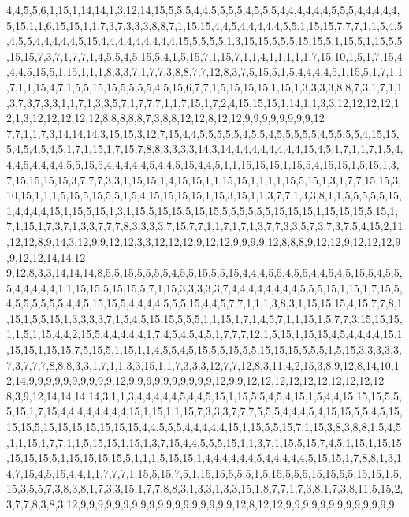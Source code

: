 4,4,5,5,6,1,15,1,14,14,1,3,12,14,15,5,5,5,4,4,5,5,5,5,4,5,5,5,4,4,4,4,4,4,5,5,5,4,4,4,4,4,5,15,1,1,6,15,15,1,1,7,3,7,3,3,3,8,8,7,1,15,15,4,4,5,4,4,4,4,4,5,5,1,15,15,7,7,7,1,1,5,4,5,4,5,5,4,4,4,4,4,5,15,4,4,4,4,4,4,4,4,4,15,5,5,5,5,1,3,15,15,5,5,5,15,15,5,1,15,5,1,15,5,5,15,15,7,3,7,1,7,7,1,4,5,5,4,5,15,5,4,1,5,15,7,1,15,7,1,1,4,1,1,1,1,1,7,15,10,1,5,1,7,15,4,4,4,5,15,5,1,15,1,1,1,8,3,3,7,1,7,7,3,8,8,7,7,12,8,3,7,5,15,5,1,5,4,4,4,4,5,1,15,5,1,7,1,1,7,1,1,15,4,7,1,5,5,15,15,5,5,5,5,4,5,15,6,7,7,1,5,15,15,15,1,15,1,3,3,3,3,8,8,7,3,1,7,1,1,3,7,3,7,3,3,1,1,7,1,3,3,5,7,1,7,7,7,1,1,7,15,1,7,2,4,15,15,15,1,14,1,1,3,3,12,12,12,12,12,1,3,12,12,12,12,12,8,8,8,8,8,7,3,8,8,12,12,8,12,12,9,9,9,9,9,9,9,9,12
7,7,1,1,7,3,14,14,14,3,15,15,3,12,7,15,4,4,5,5,5,5,5,4,5,5,4,5,5,5,5,5,4,5,5,5,5,4,15,15,5,4,5,4,5,4,5,1,7,1,15,1,7,15,7,8,8,3,3,3,3,14,3,14,4,4,4,4,4,4,4,4,15,4,5,1,7,1,1,7,1,5,4,4,4,5,4,4,4,4,5,5,15,5,4,4,4,4,4,5,4,4,5,15,4,4,5,1,1,15,15,15,1,15,5,4,15,15,1,5,15,1,3,7,15,15,15,15,3,7,7,7,3,3,1,15,15,1,4,15,15,1,1,15,15,1,1,1,1,15,5,15,1,3,1,7,7,15,15,3,10,15,1,1,1,5,15,5,15,5,5,1,5,4,15,15,15,15,1,15,3,15,1,1,3,7,7,1,3,3,8,1,1,5,5,5,5,5,15,1,4,4,4,4,15,1,15,5,15,1,3,1,15,5,15,15,5,15,15,5,5,5,5,5,5,15,15,15,1,15,15,15,5,15,1,7,1,15,1,7,3,7,1,3,3,7,7,7,8,3,3,3,3,7,15,7,7,1,1,7,1,7,1,3,7,7,3,3,5,7,3,7,3,7,5,4,15,2,11,12,12,8,9,14,3,12,9,9,12,12,3,3,12,12,12,9,12,12,9,9,9,9,12,8,8,8,9,12,12,9,12,12,12,9,9,12,12,14,14,12
9,12,8,3,3,14,14,14,8,5,5,15,5,5,5,5,4,5,5,15,5,5,15,4,4,4,5,5,4,5,5,4,4,5,4,5,15,5,4,5,5,5,4,4,4,4,4,1,1,15,15,5,15,15,5,7,1,15,3,3,3,3,3,7,4,4,4,4,4,4,4,4,5,5,5,15,1,15,1,7,15,5,4,5,5,5,5,5,5,4,4,5,15,15,5,4,4,4,4,5,5,5,15,4,4,5,7,7,1,1,1,3,8,3,1,15,15,15,4,15,7,7,8,1,15,1,5,5,15,1,3,3,3,3,7,1,5,4,5,15,15,5,5,5,1,1,15,1,7,1,4,5,7,1,1,15,1,5,7,7,3,15,15,15,1,1,5,1,15,4,4,2,15,5,4,4,4,4,4,1,7,4,5,4,5,4,5,1,7,7,7,12,1,5,15,1,15,15,4,5,4,4,4,4,15,1,15,15,1,15,15,7,5,15,5,1,15,1,1,4,5,5,4,5,15,5,5,15,5,5,15,15,15,5,5,5,1,5,15,3,3,3,3,3,7,3,7,7,7,8,8,8,3,3,1,7,1,1,3,3,15,1,1,7,3,3,3,12,7,7,12,8,3,11,4,2,15,3,8,9,12,8,14,10,12,14,9,9,9,9,9,9,9,9,9,9,12,9,9,9,9,9,9,9,9,9,9,12,9,9,12,12,12,12,12,12,12,12,12,12
8,3,9,12,14,14,14,14,3,1,1,3,4,4,4,4,4,5,4,4,5,15,1,15,5,5,4,5,4,15,1,5,4,4,15,15,15,5,5,5,15,1,7,15,4,4,4,4,4,4,4,4,15,1,15,1,1,15,7,3,3,3,7,7,7,5,5,5,4,4,4,5,4,15,15,5,5,4,5,15,15,15,5,15,15,15,15,15,15,15,4,4,5,5,5,4,4,4,4,4,15,1,15,5,5,15,7,1,15,3,8,3,8,8,1,5,4,5,1,1,15,1,7,7,1,1,5,15,15,1,15,1,3,7,15,4,4,5,5,5,15,1,1,3,7,1,15,5,15,7,4,5,1,15,1,15,15,15,15,15,5,1,15,15,15,15,5,1,1,1,5,15,15,1,4,4,4,4,4,4,5,4,4,4,4,4,5,15,15,1,7,8,8,1,3,14,7,15,4,5,15,4,4,1,1,7,7,7,1,15,5,15,7,5,1,15,15,5,5,5,1,5,15,5,5,5,15,15,5,5,15,15,1,5,15,3,5,5,7,3,8,3,8,1,7,3,3,15,1,7,7,8,8,3,1,3,3,1,3,3,15,1,8,7,7,1,7,3,8,1,7,3,8,11,5,15,2,3,7,7,8,3,8,3,12,9,9,9,9,9,9,9,9,9,9,9,9,9,9,9,9,9,9,12,8,12,12,9,9,9,9,9,9,9,9,9,9,9,9,9
